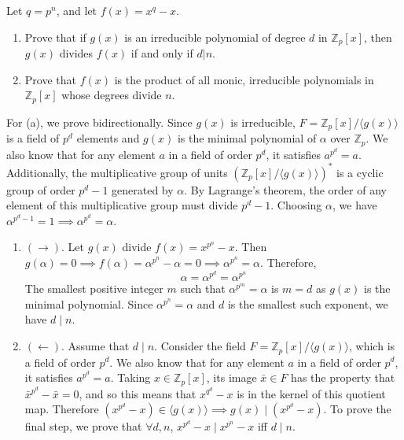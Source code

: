   \begin{exercise}[Shifrin 5.3.7]
    Let $q = p^n$, and let $f(x) = x^q - x$.
    \begin{enumerate}[label=\alph*.]
      \item Prove that if $g(x)$ is an irreducible polynomial of degree $d$ in $\mathbb{Z}_p[x]$, then $g(x)$ divides $f(x)$ if and only if $d|n$.
      \item Prove that $f(x)$ is the product of all monic, irreducible polynomials in $\mathbb{Z}_p[x]$ whose degrees divide $n$.
    \end{enumerate}
  \end{exercise}
  \begin{solution}
    For (a), we prove bidirectionally. Since $g(x)$ is irreducible, $F = \mathbb{Z}_p [x] / \langle g(x) \rangle$ is a field of $p^d$ elements and $g(x)$ is the minimal polynomial of $\alpha$ over $\mathbb{Z}_p$. We also know that for any element $a$ in a field of order $p^d$, it satisfies $a^{p^d} = a$. Additionally, the multiplicative group of units $(\mathbb{Z}_p [x] / \langle g(x)\rangle)^\ast$ is a cyclic group of order $p^d - 1$ generated by $\alpha$. By Lagrange's theorem, the order of any element of this multiplicative group must divide $p^d - 1$. Choosing $\alpha$, we have $\alpha^{p^d - 1} = 1 \implies \alpha^{p^d} = \alpha$.
    \begin{enumerate}
      \item $(\rightarrow)$. Let $g(x)$ divide $f(x) = x^{p^n} - x$. Then $g(\alpha) = 0 \implies f(\alpha) = \alpha^{p^n} - \alpha = 0 \implies \alpha^{p^n} = \alpha$. Therefore, 
      \begin{equation}
        \alpha = \alpha^{p^d} = \alpha^{p^n}
      \end{equation}
      The smallest positive integer $m$ such that $\alpha^{p^m} = \alpha$ is $m = d$ as $g(x)$ is the minimal polynomial. Since $\alpha^{p^n} = \alpha$ and $d$ is the smallest such exponent, we have $d \mid n$.  

      \item $(\leftarrow)$. Assume that $d \mid n$.
      Consider the field $F = \mathbb{Z}_p [x] / \langle g(x) \rangle$, which is a field of order $p^d$. We also know that for any element $a$ in a field of order $p^d$, it satisfies $a^{p^d} = a$. Taking $x \in \mathbb{Z}_p [x]$, its image $\bar{x} \in F$ has the property that $\bar{x}^{p^d} - \bar{x} = 0$, and so this means that $x^{q^d} - x$ is in the kernel of this quotient map. Therefore $(x^{p^d} - x) \in \langle g(x) \rangle \implies g(x) \mid (x^{p^d} - x)$. To prove the final step, we prove that $\forall d, n$, $x^{p^d}  - x \mid x^{p^n} - x$ iff $d \mid n$. 
      

\end{enumerate}
\end{solution}

